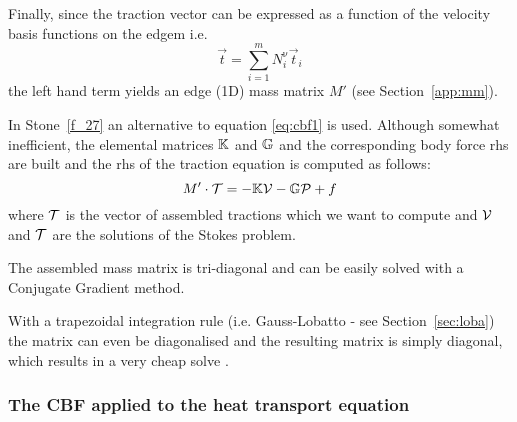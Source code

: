 Finally, since the traction vector can be expressed as a function of the velocity 
basis functions on the edgem i.e.
\[
\vec{t} = \sum_{i=1}^m N_i^\upnu \vec{t}_i
\]
the left hand term yields an edge (1D) mass matrix $M'$ (see Section~\ref{app:mm}).

\begin{remark}
In Stone~\ref{f_27} an alternative to equation \ref{eq:cbf1} is used. Although
somewhat inefficient, the elemental matrices ${\mathbb{K}}$ and ${\mathbb{G}}$ and the corresponding 
body force rhs are built and the rhs of the traction equation is computed as follows:
\[
M' \cdot {\cal T} = -{\mathbb{K}} {\cal V} - {\mathbb{G}} {\cal P} + f
\]
where ${\cal T}$ is the vector of assembled tractions which we want to compute 
and ${\cal V}$ and ${\cal T}$ are the solutions of the Stokes problem. 
\end{remark}

\begin{remark} 
The assembled mass matrix is tri-diagonal and can be easily solved with 
a Conjugate Gradient method. 
\end{remark}

\begin{remark} 
With a trapezoidal integration rule 
(i.e. Gauss-Lobatto - see Section~\ref{sec:loba}) the matrix can even be diagonalised and the resulting 
matrix is simply diagonal, which results in a very cheap solve \cite{zhgh93}.
\end{remark}

\subsubsection{The CBF applied to the heat transport equation}

